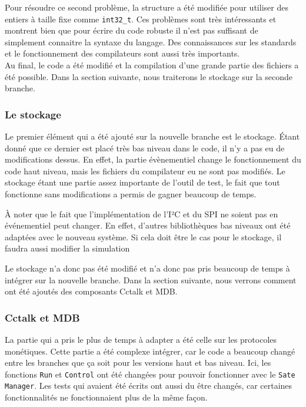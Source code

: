 \documentclass[a4paper]{article}
\begin{document}
Pour résoudre ce second problème, la structure a été modifiée pour utiliser des
entiers à taille fixe comme \verb|int32_t|. Ces problèmes sont très
intéressants et montrent bien que pour écrire du code robuste il n'est pas
suffisant de simplement connaitre la syntaxe du langage. Des connaissances sur
les standards et le fonctionnement des compilateurs sont aussi très
importants.\\

Au final, le code a été modifié et la compilation d'une grande partie des
fichiers a été possible. Dans la section suivante, nous traiterons le stockage sur
la seconde branche.

\subsubsection*{Le stockage}

Le premier élément qui a été ajouté sur la nouvelle branche est le stockage.
Étant donné que ce dernier est placé très bas niveau dans le code, il n'y a pas
eu de modifications dessus. En effet, la partie évènementiel change le
fonctionnement du code haut niveau, mais les fichiers du compilateur eu ne sont
pas modifiés. Le stockage étant une partie assez importante de l'outil de test,
le fait que tout fonctionne sans modifications a permis de gagner beaucoup de
temps.

À noter que le fait que l'implémentation de l'I²C et du SPI ne soient pas en
événementiel peut changer. En effet, d'autres bibliothèques bas niveaux ont
été adaptées avec le nouveau système. Si cela doit être le cas pour le stockage,
il faudra aussi modifier la simulation

Le stockage n'a donc pas été modifié et n'a donc pas pris beaucoup de temps à
intégrer sur la nouvelle branche. Dans la section suivante, nous verrons comment
ont été ajoutés des composants Cctalk et MDB.

\subsubsection*{Cctalk et MDB}

La partie qui a pris le plus de temps à adapter a été celle sur les protocoles
monétiques. Cette partie a été complexe intégrer, car le code a beaucoup changé
entre les branches que ça soit pour les versions haut et bas niveau. Ici, les
fonctions \verb|Run| et \verb|Control| ont été changées pour pouvoir fonctionner
avec le \verb|Sate Manager|. Les tests qui avaient été écrits ont aussi du être
changés, car certaines fonctionnalités ne fonctionnaient plus de la même façon.
\end{document}
